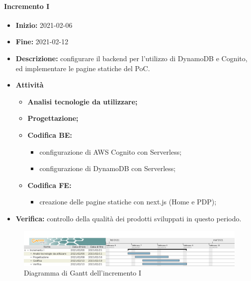 \paragraph[Incremento I]{Incremento I}
\begin{itemize}
    \item [] \textbf{Inizio:} 2021-02-06
    \item [] \textbf{Fine:} 2021-02-12
    \item [] \textbf{Descrizione:} configurare il backend per l'utilizzo di DynamoDB e Cognito, ed implementare le pagine statiche del PoC.
    \item [] \textbf{Attività}
          \begin{itemize}
              \item \textbf{Analisi tecnologie da utilizzare;}
              \item \textbf{Progettazione;}
              \item \textbf{Codifica BE:}
                    \begin{itemize}
                        \item configurazione di AWS Cognito con Serverless;
                        \item configurazione di DynamoDB con Serverless;
                    \end{itemize}
              \item \textbf{Codifica FE:}
                    \begin{itemize}
                        \item creazione delle pagine statiche con next.js (Home e PDP);
                    \end{itemize}
          \end{itemize}
    \item \textbf{Verifica:} controllo della qualità dei prodotti sviluppati in questo periodo.
\end{itemize}

\begin{figure}[H]
    \centering
    \includegraphics[width=1\linewidth]{res/images/pianificazione/incremento_1.png}
    \caption{Diagramma di Gantt dell'incremento I}
    \label{fig:_Gantt incremento I}
\end{figure}

